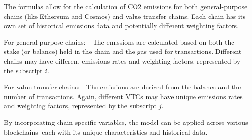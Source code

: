 \documentclass[12pt,a4paper]{report}
\begin{document}
The formulas allow for the calculation of CO2 emissions for both general-purpose chains (like Ethereum and Cosmos) and value transfer chains. Each chain has its own set of historical emissions data and potentially different weighting factors.

For general-purpose chains:
- The emissions are calculated based on both the stake (or balance) held in the chain and the gas used for transactions. Different chains may have different emissions rates and weighting factors, represented by the subscript \( i \).

For value transfer chains:
- The emissions are derived from the balance and the number of transactions. Again, different VTCs may have unique emissions rates and weighting factors, represented by the subscript \( j \).

By incorporating chain-specific variables, the model can be applied across various blockchains, each with its unique characteristics and historical data.
\end{document}
